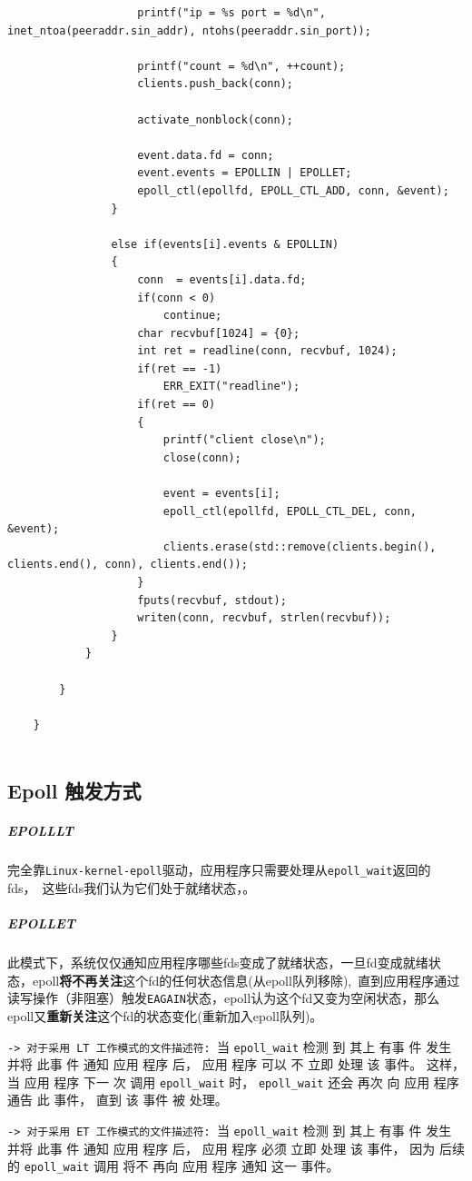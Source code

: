 \documentclass[UTF8,a4paper,8pt]{ctexbook}
\begin{document}
\begin{lstlisting}
					printf("ip = %s port = %d\n", inet_ntoa(peeraddr.sin_addr), ntohs(peeraddr.sin_port));
					
					printf("count = %d\n", ++count);
					clients.push_back(conn);
					
					activate_nonblock(conn);
					
					event.data.fd = conn;
					event.events = EPOLLIN | EPOLLET;
					epoll_ctl(epollfd, EPOLL_CTL_ADD, conn, &event);
				}
				
				else if(events[i].events & EPOLLIN)
				{
					conn  = events[i].data.fd;
					if(conn < 0)
						continue;
					char recvbuf[1024] = {0};
					int ret = readline(conn, recvbuf, 1024);
					if(ret == -1)
						ERR_EXIT("readline");
					if(ret == 0)
					{
						printf("client close\n");
						close(conn);
						
						event = events[i];
						epoll_ctl(epollfd, EPOLL_CTL_DEL, conn, &event);
						clients.erase(std::remove(clients.begin(), clients.end(), conn), clients.end());
					}
					fputs(recvbuf, stdout);
					writen(conn, recvbuf, strlen(recvbuf));
				}
			}
		
		}
		
	}
	
				\end{lstlisting}
			\subsection{Epoll 触发方式}
				\subparagraph{EPOLLLT}完全靠\verb|Linux-kernel-epoll|驱动，应用程序只需要处理从\verb|epoll_wait|返回的fds， 这些fds我们认为它们处于就绪状态，。
				
				\subparagraph{EPOLLET}此模式下，系统仅仅通知应用程序哪些fds变成了就绪状态，一旦fd变成就绪状态，epoll\textbf{将不再关注}这个fd的任何状态信息(从epoll队列移除), 直到应用程序通过读写操作（非阻塞）触发\verb|EAGAIN|状态，epoll认为这个fd又变为空闲状态，那么epoll又\textbf{重新关注}这个fd的状态变化(重新加入epoll队列)。 
				
				\verb|-> 对于采用 LT 工作模式的文件描述符: |当 \verb|epoll_wait| 检测 到 其上 有事 件 发生 并将 此事 件 通知 应用 程序 后， 应用 程序 可以 不 立即 处理 该 事件。 这样， 当 应用 程序 下一 次 调用 \verb|epoll_wait| 时， \verb|epoll_wait| 还会 再次 向 应用 程序 通告 此 事件， 直到 该 事件 被 处理。 
				
				\verb|-> 对于采用 ET 工作模式的文件描述符: |当 \verb|epoll_wait| 检测 到 其上 有事 件 发生 并将 此事 件 通知 应用 程序 后， 应用 程序 必须 立即 处理 该 事件， 因为 后续 的 \verb|epoll_wait| 调用 将不 再向 应用 程序 通知 这一 事件。 
				
\end{document}
